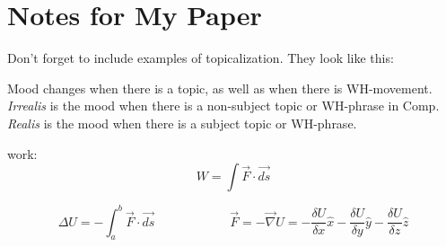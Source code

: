 

\section*{Notes for My Paper}

Don't forget to include examples of topicalization.
They look like this: 






Mood changes when there is a topic, as well as when
there is WH-movement. \emph{Irrealis} is the mood when
there is a non-subject topic or WH-phrase in Comp. \emph{Realis}
is the mood when there is a subject topic
or WH-phrase.

work: 
\begin{equation}
  \quad W = \int \vec{F} \cdot \vec{ds} \quad
\end{equation}

\begin{equation}
  \Delta U=-\int_{a}^{b} \vec{F} \cdot \vec{ds} \qquad \qquad \qquad
  \vec{F} = -\vec{\nabla}U = - \frac{\delta U}{\delta x}\hat{x} - \frac{\delta U}{\delta y}\hat{y} - \frac{\delta U}{\delta z}\hat{z}
\end{equation}

